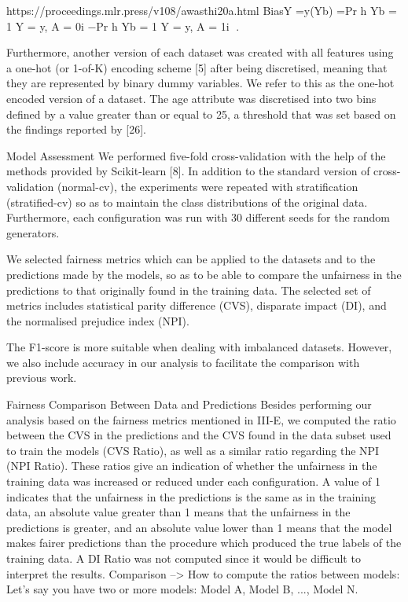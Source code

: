 \documentclass[12pt, a4paper, oneside]{book}   	%
\newif\ifrawcitationactive
\newcommand{\rawcitationstart}{
	\color{purple}\rawcitationactivetrue
}
\newcommand{\rawcitationusedend}{%
	\ifrawcitationactive
	\color{purple}  %
	\else
	\color{black}  %
	\fi
}
\begin{document}
		https://proceedings.mlr.press/v108/awasthi20a.html
		BiasY =y(Yb) =Pr h		Yb = 1	Y = y, A = 0i −Pr h	Yb = 1 		Y = y, A = 1i				.
		\rawcitationusedend
		
				\rawcitationstart
		Furthermore, another version of each dataset was created with all features using a one-hot (or 1-of-K) encoding scheme [5] after being discretised, meaning that they are represented by binary dummy variables. We refer to this as the one-hot encoded version of a dataset.
		\autocite{Valentim_2019}
		The age attribute was discretised into two bins defined by a value greater than or equal to 25, a threshold that was set based on the findings reported by [26]. \autocite{Valentim_2019}
		
		Model Assessment
		We performed five-fold cross-validation with the help of the methods provided by Scikit-learn [8]. In addition to the standard version of cross-validation (normal-cv), the experiments were repeated with stratification (stratified-cv) so as to maintain the class distributions of the original data. Furthermore, each configuration was run with 30 different seeds for the random generators.
		
		We selected fairness metrics which can be applied to the datasets and to the predictions made by the models, so as to be able to compare the unfairness in the predictions to that originally found in the training data. The selected set of metrics includes statistical parity difference (CVS), disparate impact (DI), and the normalised prejudice index (NPI).
		
		The F1-score is more suitable when dealing with imbalanced datasets. However, we also include accuracy in our analysis to facilitate the comparison with previous work. \autocite{Valentim_2019}
		
		Fairness Comparison Between Data and Predictions
		Besides performing our analysis based on the fairness metrics mentioned in III-E, we computed the ratio between the CVS in the predictions and the CVS found in the data subset used to train the models (CVS Ratio), as well as a similar ratio regarding the NPI (NPI Ratio). These ratios give an indication of whether the unfairness in the training data was increased or reduced under each configuration. A value of 1 indicates that the unfairness in the predictions is the same as in the training data, an absolute value greater than 1 means that the unfairness in the predictions is greater, and an absolute value lower than 1 means that the model makes fairer predictions than the procedure which produced the true labels of the training data. A DI Ratio was not computed since it would be difficult to interpret the results. \autocite{Valentim}
		Comparison
		-->  How to compute the ratios between models:
		Let’s say you have two or more models: Model A, Model B, ..., Model N.
		
\end{document}
